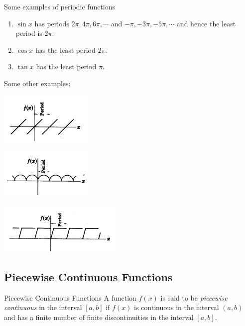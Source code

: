 \documentclass[12pt]{article}
\numberwithin{equation}{subsection}
\begin{document}
\begin{example}{Some examples of periodic functions}{}
    \begin{enumerate}
        \item $\sin{x}$ has periods $2\pi, 4\pi, 6\pi, \cdots$ and $-\pi, -3\pi, -5\pi, \cdots$ and hence the least period is $2\pi$.\\
        \item $\cos{x}$ has the least period $2\pi$.\\
        \item $\tan{x}$ has the least period $\pi$.
    \end{enumerate}
    Some other examples:\\
    \begin{minipage}{.3\textwidth}
        \renewcommand{\thefigure}{1.1.1}
        \includegraphics[scale=0.8]{./images/1.1.1.png}
    \end{minipage}
    \begin{minipage}{.3\textwidth}
        \renewcommand{\thefigure}{1.1.2}
        \includegraphics[scale=0.8]{./images/1.1.2.png}
    \end{minipage}
    \begin{minipage}{.35\textwidth}
        \renewcommand{\thefigure}{1.1.3}
        \includegraphics[scale=0.74]{./images/1.1.3.png}
    \end{minipage}
\end{example}

\subsection{Piecewise Continuous Functions}
\begin{definition}{Piecewise Continuous Functions}{}
    A function $f(x)$ is said to be \textit{piecewise continuous} in the interval $[a,b]$ if $f(x)$ is continuous in the interval $(a,b)$ and has a finite number of finite discontinuities in the interval $[a,b]$.
\end{definition}
\end{document}

